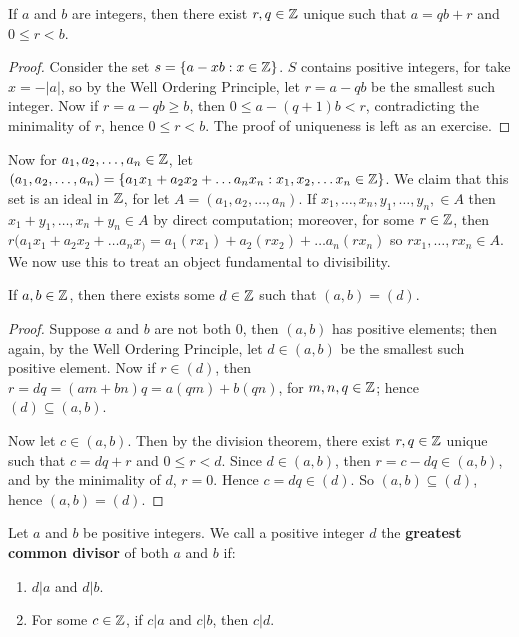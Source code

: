 \begin{lemma}\label{lemma1.1.1}
    If $a$ and $b$ are integers, then there exist $r,q \in \mathbb{Z}$ unique such that $a=qb+r$ and $0 \leq r < b$.
\end{lemma}
\begin{proof}
    Consider the set $s=\{a-xb:x \in \mathbb{Z}\}$. $S$ contains positive integers, for take $x=-|a|$, so by the Well Ordering Principle, let $r=a-qb$ be the smallest such integer. Now if $r=a-qb \geq b$, then $0 \leq a-(q+1)b <r $, contradicting the minimality of $r$, hence $0 \leq r < b$. The proof of uniqueness is left as an exercise. 
\end{proof}

Now for $a_1,a_2, \dots, a_n \in \mathbb{Z}$, let $(a_1,a_2, \dots, a_n)=\{a_1x_1+a_2x_2+ \dots a_nx_n:x_1,x_2, \dots x_n \in \mathbb{Z}\}$. We claim that this set is an ideal in $\mathbb{Z}$, for let $A=(a_1,a_2, \dots, a_n)$. If $x_1, \dots, x_n,y_1, \dots, y_n, \in A$ then $x_1+y_1, \dots, x_n+y_n \in A$ by direct computation; moreover, for some $r \in \mathbb{Z}$, then $r(a_1x_1+a_2x_2+ \dots a_nx_)=a_1(rx_1)+a_2(rx_2)+ \dots a_n(rx_n)$ so $rx_1, \dots, rx_n \in A$. We now use this to treat an object fundamental to divisibility.

\begin{lemma}\label{lemma1.1.2}
    If $a,b \in\mathbb{Z}$, then there exists some $d \in \mathbb{Z}$ such that $(a,b)=(d)$.
\end{lemma}
\begin{proof}
    Suppose $a$ and $b$ are not both 0, then $(a,b)$ has positive elements; then again, by the Well Ordering Principle, let $d \in (a,b)$ be the smallest such positive element. Now if $r \in (d)$, then $r=dq=(am+bn)q=a(qm)+b(qn)$, for $m,n,q \in \mathbb{Z}$; hence $(d) \subseteq (a,b)$. 
    
    Now let $c \in (a,b)$. Then by the division theorem, there exist $r,q \in \mathbb{Z}$ unique such that $c=dq+r$ and $0 \leq r < d$. Since $d \in (a,b)$, then $r=c-dq \in (a,b)$, and by the minimality of $d$, $r=0$. Hence $c=dq \in (d)$. So $(a,b) \subseteq (d)$, hence $(a,b)=(d)$. 
\end{proof}

\begin{definition}
    Let $a$ and $b$ be positive integers. We call a positive integer $d$ the \textbf{greatest common divisor} of both $a$ and $b$ if:
        \begin{enumerate}[label=(\arabic*)]
            \item $d|a$ and $d|b$.
            
            \item For some $c \in \mathbb{Z}$, if $c|a$ and $c|b$, then $c|d$. 
        \end{enumerate}
\end{definition}

